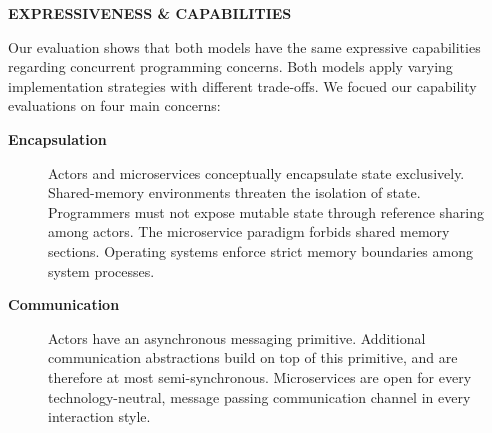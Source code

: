 \documentclass[final,hyperref={pdfpagelabels=true}]{beamer}
\begin{document}
\begin{frame}
  \begin{columns}[t]
    \begin{column}{.04\textwidth}
      \end{column}
    \begin{column}{.43\textwidth}
      \textsf{\textbf{EXPRESSIVENESS \& CAPABILITIES}} \\
      \vspace*{.5\baselineskip}
      {\lmodern
        \begin{justify}
        Our evaluation shows that both models have the same expressive capabilities regarding concurrent programming concerns. Both models apply varying implementation strategies with different trade-offs. We focued our capability evaluations on four main concerns:
        \end{justify}
        
        \vspace*{\baselineskip}

        \renewcommand\sfdefault{lmss} %

        \begin{description}
          \item[\textbf{\textsf{Encapsulation}}] 
          \begin{justify}
          Actors and microservices conceptually encapsulate state exclusively. Shared-memory environments threaten the isolation of state. Programmers must not expose mutable state through reference sharing among actors. The microservice paradigm forbids shared memory sections. Operating systems enforce strict memory boundaries among system processes.
          \end{justify}

          \vspace*{1.5\baselineskip}

          \item[\textbf{\textsf{Communication}}] 
          \begin{justify}
          Actors have an asynchronous messaging primitive. Additional communication abstractions build on top of this primitive, and are therefore at most semi-synchronous. Microservices are open for every technology-neutral, message passing communication channel in every interaction style.
          \end{justify}

          \vspace*{1.5\baselineskip}


\end{description}}
\end{column}
\end{columns}
\end{frame}
\end{document}
